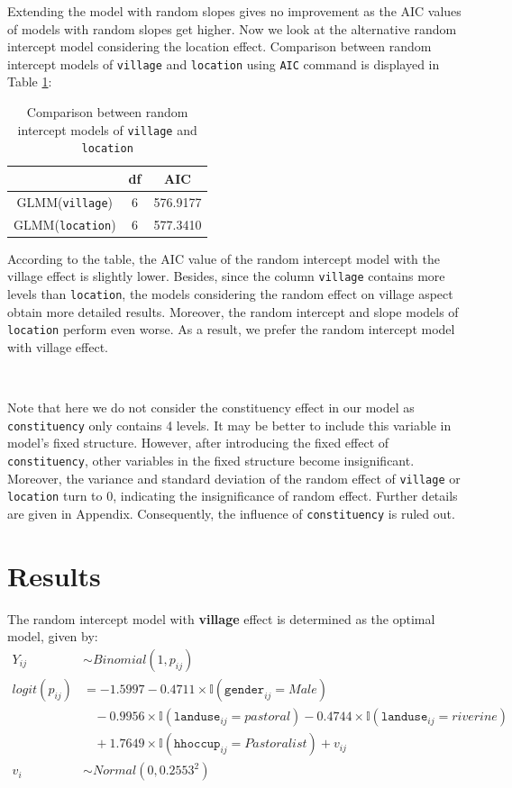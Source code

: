 \documentclass[11pt,twoside]{article}
\numberwithin{Theorem}{section}
\numberwithin{Definition}{section}
\numberwithin{Lemma}{section}
\numberwithin{Algorithm}{section}
\numberwithin{equation}{section}
\begin{document}
Extending the model with random slopes gives no improvement as the AIC values of models with random slopes get higher. Now we look at the alternative random intercept model considering the location effect. Comparison between random intercept models of \texttt{village} and \texttt{location} using \texttt{AIC} command is displayed in Table \ref{tab:glmm3}:

\begin{table}[!h]
	\centering
	\begin{tabular}{|c|c|c|}
		\hline
		& df & AIC  \\  
		\hline
		GLMM(\texttt{village}) & 6 & 576.9177	\\	
		GLMM(\texttt{location}) & 6 & 577.3410 \\
		\hline
	\end{tabular}
	\caption{Comparison between random intercept models of \texttt{village} and \texttt{location}}
	\label{tab:glmm3}
\end{table}

According to the table, the AIC value of the random intercept model with the village effect is slightly lower. Besides, since the column \texttt{village} contains more levels than \texttt{location}, the models considering the random effect on village aspect obtain more detailed results. Moreover, the random intercept and slope models of \texttt{location} perform even worse. As a result, we prefer the random intercept model with village effect.

\

Note that here we do not consider the constituency effect in our model as \texttt{constituency} only contains 4 levels. It may be better to include this variable in model's fixed structure. However, after introducing the fixed effect of \texttt{constituency}, other variables in the fixed structure become insignificant. Moreover, the variance and standard deviation of the random effect of \texttt{village} or \texttt{location} turn to 0, indicating the insignificance of random effect. Further details are given in Appendix. Consequently, the influence of \texttt{constituency} is ruled out.

\clearpage

\section{Results}
\label{sec:results}

The random intercept model with \textbf{village} effect is determined as the optimal model, given by:
\begin{align*}
	Y_{ij} & \sim Binomial(1, p_{ij}) \\
	logit(p_{ij}) &=  -1.5997 - 0.4711 \times \mathbb{I}(\texttt{gender}_{ij} = Male)  \\
					      & \ \ \ \ - 0.9956 \times \mathbb{I}(\texttt{landuse}_{ij} = pastoral) - 0.4744 \times \mathbb{I}(\texttt{landuse}_{ij} = riverine) \\
					      & \ \ \ \ + 1.7649 \times \mathbb{I}(\texttt{hhoccup}_{ij} = Pastoralist) + v_{ij} \\
	v_i & \sim Normal(0, 0.2553^2)
\end{align*}	
\end{document}
